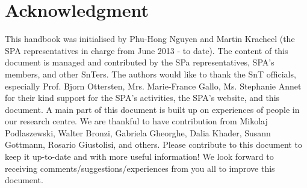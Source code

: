 \section*{Acknowledgment}
This handbook was initialised by Phu-Hong Nguyen and Martin Kracheel (the SPA representatives in charge from June 2013 - to date). The content of this document is managed and contributed by the SPa representatives, SPA's members, and other SnTers. The authors would like to thank the SnT officials, especially Prof. Bjorn Ottersten, Mrs. Marie-France Gallo, Ms. Stephanie Annet for their kind support for the SPA's activities, the SPA's website, and this document. 
A main part of this document is built up on experiences of people in our research centre. 
We are thankful to have contribution from Mikolaj Podlaszewski, Walter Bronzi, Gabriela Gheorghe, Dalia Khader, Susann Gottmann, Rosario Giustolisi, and others. 
Please contribute to this document to keep it up-to-date and with more useful information! 
We look forward to receiving comments/suggestions/experiences from you all to improve this document. 

